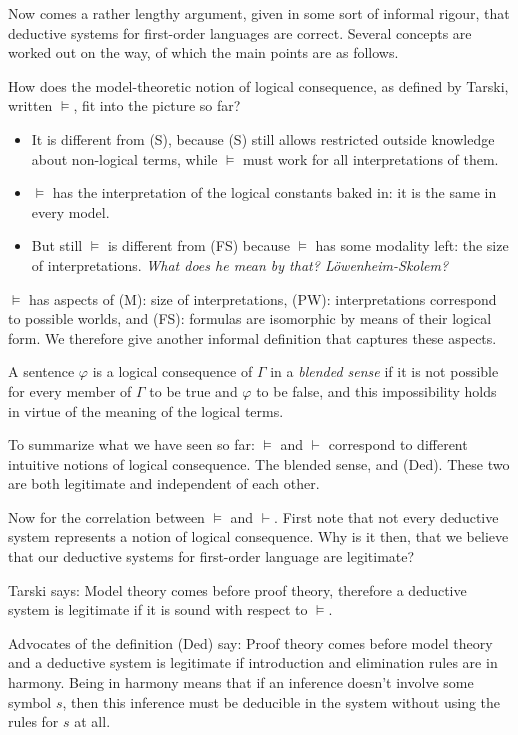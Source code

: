 \documentclass[a4paper]{article}
\begin{document}
Now comes a rather lengthy argument, given in some sort of informal rigour, that
deductive systems for first-order languages are correct.  Several concepts are
worked out on the way, of which the main points are as follows.

How does the model-theoretic notion of logical consequence, as defined by
Tarski, written $\models$, fit into the picture so far?
\begin{itemize}
  \item It is different from (S), because (S) still allows restricted outside
  knowledge about non-logical terms, while $\models$ must work for all
  interpretations of them.

  \item $\models$ has the interpretation of the logical constants baked in: it
  is the same in every model.

  \item But still $\models$ is different from (FS) because $\models$ has some
  modality left: the size of interpretations.  \emph{What does he mean by that?
  Löwenheim-Skolem?}

\end{itemize}

$\models$ has aspects of (M): size of interpretations, (PW): interpretations
correspond to possible worlds, and (FS): formulas are isomorphic by means of
their logical form.  We therefore give another informal definition that captures
these aspects.

A sentence $\varphi$ is a logical consequence of $\Gamma$ in a \emph{blended
sense} if it is not possible for every member of $\Gamma$ to be true and
$\varphi$ to be false, and this impossibility holds in virtue of the meaning of
the logical terms.

To summarize what we have seen so far:  $\models$ and $\vdash$ correspond to
different intuitive notions of logical consequence.  The blended sense, and
(Ded).  These two are both legitimate and independent of each other.

Now for the correlation between $\models$ and $\vdash$. First note that not
every deductive system represents a notion of logical consequence.  Why is it
then, that we believe that our deductive systems for first-order language are
legitimate?

Tarski says: Model theory comes before proof theory, therefore a deductive
system is legitimate if it is sound with respect to $\models$.

Advocates of the definition (Ded) say: Proof theory comes before model theory
and a deductive system is legitimate if introduction and elimination rules are
in harmony.  Being in harmony means that if an inference doesn't involve some
symbol $s$, then this inference must be deducible in the system without using
the rules for $s$ at all.
\end{document}
